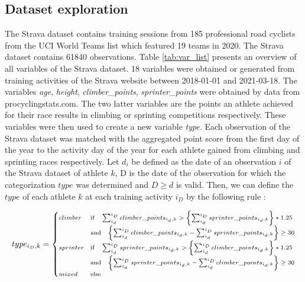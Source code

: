 \documentclass[12pt,a4paper]{article}
\begin{document}
\hypertarget{dataset-exploration}{%
\subsection{\texorpdfstring{Dataset exploration \label{sec:dataset_expo}}{Dataset exploration }}\label{dataset-exploration}}

The Strava dataset contains training sessions from 185 professional road cyclists from the UCI World Teams list which featured 19 teams in 2020. The Strava dataset contains 61840 observations. Table \ref{tab:var_list} presents an overview of all variables of the Strava dataset. 18 variables were obtained or generated from training activities of the Strava website between 2018-01-01 and 2021-03-18. The variables \textit{age}, \textit{height}, \textit{climber\_points}, \textit{sprinter\_points} were obtained by data from procyclingstats.com. The two latter variables are the points an athlete achieved for their race results in climbing or sprinting competitions respectively. These variables were then used to create a new variable \textit{type}. Each observation of the Strava dataset was matched with the aggregated point score from the first day of the year to the activity day of the year for each athlete gained from climbing and sprinting races respectively. Let \(d_i\) be defined as the date of an observation \(i\) of the Strava dataset of athlete \(k\), D is the date of the observation for which the categorization \(type\) was determined and \(D \geq d\) is valid. Then, we can define the \(type\) of each athlete \(k\) at each training activity \(i_D\) by the following rule :

\begin{gather}
\scriptsize
type_{i_D, k} =  
\begin{cases}
climber  & \mbox{if} \quad \sum_{i_{d}}^{i_{D}}climber\_points_{i_d, k} >  \biggl\{ \sum_{i_{d}}^{i_{D}}sprinter\_points_{i_d, k} \biggr\}*1.25 \\
& \mbox{and} \quad  \biggl\{\sum_{i_{d}}^{i_{D}}climber\_points_{i_d, k} -  \sum_{i_{d}}^{i_{D}}sprinter\_points_{i_d, k} \biggr\} \geq 30  \\
sprinter & \mbox{if} \quad  \sum_{i_{d}}^{i_{D}}sprinter\_points_{i_d, k} >  \biggl\{ \sum_{i_{d}}^{i_{D}}climber\_points_{i_d, k} \biggr\}*1.25   \\
 & \mbox{and} \quad  \biggl\{\sum_{i_{d}}^{i_{D}}sprinter\_points_{i_d, k} -  \sum_{i_{d}}^{i_{D}}climber\_points_{i_d, k} \biggr\} \geq 30 \\
mixed   &  \mbox{else} 
\end{cases}
\label{eq:type_rule}
\end{gather}
\end{document}
